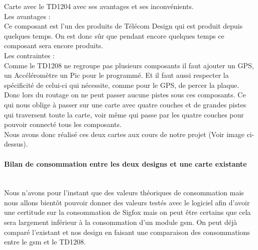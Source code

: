 \documentclass[10pt,a4paper]{article}
\begin{document}
Carte avec le TD1204 avec ses avantages et ses inconvénients. \\Les avantages :\\Ce composant est l'un des produits de Télécom Design qui est produit depuis quelques temps. On est donc sûr que pendant encore quelques temps ce composant sera encore produits.\\ Les contraintes :\\Comme le TD1208 ne regroupe pas plusieurs composants il faut ajouter un GPS, un Accéléromètre un Pic pour le programmé.  Et il faut aussi respecter la spécificité de celui-ci qui nécessite, comme pour le GPS, de percer la plaque. Donc lors du routage on ne peut passer aucune pistes sous ces composants. Ce qui nous oblige à passer sur une carte avec quatre couches et de grandes pistes qui traversent toute la carte, voir même qui passe par les quatre couches pour pouvoir connecté tous les composants. \\Nous avons donc réalisé ces deux cartes aux cours de notre projet (Voir image ci-dessus). \\

\paragraph{Bilan de consommation entre les deux designs et une carte existante}\\
Nous n'avons pour l'instant que des valeurs théoriques de consommation mais nous allons bientôt pouvoir donner des valeurs testés avec le logiciel afin d'avoir une certitude sur la consommation de Sigfox mais on peut être certains que cela sera largement inférieur à la consommation d'un module gsm. On peut déjà comparé l'existant et nos design en faisant une comparaison des consommations entre le gsm et le TD1208.
\end{document}
